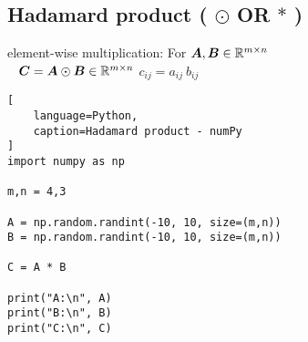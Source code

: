 \subsection{Hadamard product ( $\odot$ OR $\ast$ ) \cite{mfml/book/mml/Deisenroth-Faisal-Ong}}

element-wise multiplication: For $\bm{A}, \bm{B} \in \mathbb{R}^{m\times n}$
\\
\ 
\hfill
$
    \bm{C} = \bm{A} \odot \bm{B} \in \mathbb{R}^{m\times n}
$
\hfill
$
    c_{ij} = a_{ij}\ b_{ij}
$
\hfill
\ 













\begin{lstlisting}[
    language=Python,
    caption=Hadamard product - numPy
]
import numpy as np

m,n = 4,3

A = np.random.randint(-10, 10, size=(m,n))
B = np.random.randint(-10, 10, size=(m,n))

C = A * B

print("A:\n", A)
print("B:\n", B)
print("C:\n", C)
\end{lstlisting}










